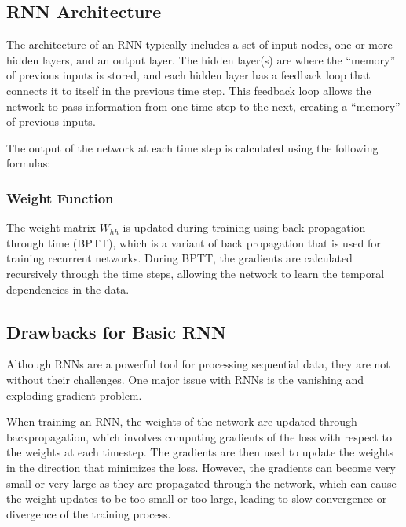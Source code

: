 \documentclass[
]{article}
\begin{document}
\hypertarget{rnn-architecture}{%
\subsection{RNN Architecture}\label{rnn-architecture}}

The architecture of an RNN typically includes a set of input nodes, one
or more hidden layers, and an output layer. The hidden layer(s) are
where the ``memory'' of previous inputs is stored, and each hidden layer
has a feedback loop that connects it to itself in the previous time
step. This feedback loop allows the network to pass information from one
time step to the next, creating a ``memory'' of previous inputs.

The output of the network at each time step is calculated using the
following formulas:

\hypertarget{weight-function}{%
\subsubsection{Weight Function}\label{weight-function}}

The weight matrix \(W_{hh}\) is updated during training using back
propagation through time (BPTT), which is a variant of back propagation
that is used for training recurrent networks. During BPTT, the gradients
are calculated recursively through the time steps, allowing the network
to learn the temporal dependencies in the data.

\hypertarget{drawbacks-for-basic-rnn}{%
\subsection{Drawbacks for Basic RNN}\label{drawbacks-for-basic-rnn}}

Although RNNs are a powerful tool for processing sequential data, they
are not without their challenges. One major issue with RNNs is the
vanishing and exploding gradient problem.

When training an RNN, the weights of the network are updated through
backpropagation, which involves computing gradients of the loss with
respect to the weights at each timestep. The gradients are then used to
update the weights in the direction that minimizes the loss. However,
the gradients can become very small or very large as they are propagated
through the network, which can cause the weight updates to be too small
or too large, leading to slow convergence or divergence of the training
process.
\end{document}

